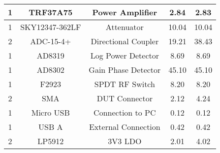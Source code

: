 \begin{table}[h!]
\begin{tabular}{|c|c|c|c|c|}
		1                 & TRF37A75                   & Power Amplifier          & 2.84                                                                  & 2.83                                                                      \\ \hline
		1                 & SKY12347-362LF             & Attenuator  & 10.04                                                                 & 10.04                                                                     \\ \hline
		2                 & ADC-15-4+                  & Directional Coupler      & 19.21                                                                 & 38.43                                                                     \\ \hline
		1                 & AD8319                     & Log Power Detector       & 8.69                                                                   & 8.69                                                                       \\ \hline
		1                 & AD8302                     & Gain Phase Detector      & 45.10                                                                   & 45.10                                                                       \\ \hline
		1                 & F2923                      & SPDT RF Switch           & 8.20                                                                  & 8.20                                                                      \\ \hline
		2                 & SMA                        & DUT Connector            & 2.12                                                                  & 4.24                                                                      \\ \hline
		1                 & Micro USB                  & Connection to PC         & 0.12                                                                  & 0.12                                                                      \\ \hline
		1                 & USB A                      & External Connection & 0.42                                                                  & 0.42                                                                     \\ \hline
		2                 & LP5912                     & 3V3 LDO                  & 2.01                                                                 & 4.02                                                                     \\ \hline

\end{tabular}
\end{table}
